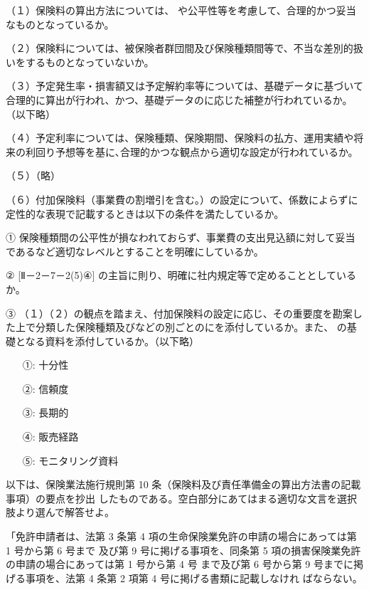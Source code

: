\documentclass[report,gutter=10mm,fore-edge=10mm,uplatex,dvipdfmx]{jlreq}
\begin{document}
（１）保険料の算出方法については、 や公平性等を考慮して、合理的かつ妥当なものとなっているか。

（２）保険料については、被保険者群団間及び保険種類間等で、不当な差別的扱いをするものとなっていないか。

（３）予定発生率・損害額又は予定解約率等については、基礎データに基づいて合理的に算出が行われ、かつ、基礎データのに応じた補整が行われているか。（以下略）

（４）予定利率については、保険種類、保険期間、保険料の払方、運用実績や将来の利回り予想等を基に､合理的かつな観点から適切な設定が行われているか。

（５）（略）

（６）付加保険料（事業費の割増引を含む｡）の設定について、係数によらずに定性的な表現で記載するときは以下の条件を満たしているか。

① 保険種類間の公平性が損なわれておらず、事業費の支出見込額に対して妥当であるなど適切なレベルとすることを明確にしているか。

② [Ⅱ－2－7－2(5)④] の主旨に則り、明確に社内規定等で定めることとしているか。

③ （１）（２）の観点を踏まえ、付加保険料の設定に応じ、その重要度を勘案した上で分類した保険種類及びなどの別ごとのにを添付しているか。また、 の基礎となる資料を添付しているか。（以下略）

\answer{}
\begin{itemize}
\item[ ①:] 十分性
\item[ ②:] 信頼度
\item[ ③:] 長期的
\item[ ④:] 販売経路
\item[ ⑤:] モニタリング資料
\end{itemize}


以下は、保険業法施行規則第 10 条（保険料及び責任準備金の算出方法書の記載事項）の要点を抄出
したものである。空白部分にあてはまる適切な文言を選択肢より選んで解答せよ。

「免許申請者は、法第 3 条第 4 項の生命保険業免許の申請の場合にあっては第 1 号から第 6 号まで
及び第 9 号に掲げる事項を、同条第 5 項の損害保険業免許の申請の場合にあっては第 1 号から第 4 号
まで及び第 6 号から第 9 号までに掲げる事項を、法第 4 条第 2 項第 4 号に掲げる書類に記載しなけれ
ばならない。
\end{document}
